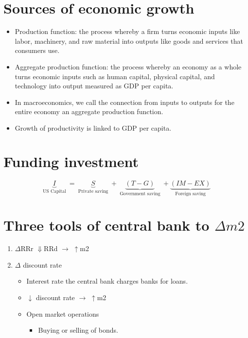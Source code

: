 \documentclass[openany]{book}
\begin{document}
\section{Sources of economic growth}
\begin{itemize}
    \item Production function: the process whereby a firm turns economic inputs like labor, machinery, and raw material into outputs like goods and services that consumers use.
    \item Aggregate production function: the process whereby an economy as a whole turns economic inputs such as human capital, physical capital, and technology into output measured as GDP per capita. 
    \item In macroeconomics, we call the connection from inputs to outputs for the entire economy an aggregate production function.
    \item Growth of productivity is linked to GDP per capita.
\end{itemize}

\section{Funding investment}
\[
  \underbrace{I}_{\text{ US Capital }} = \underbrace{S}_{\text{ Private saving }} + \underbrace{(T-G)}_{\text{ Government saving }} + \underbrace{(IM-EX)}_{\text{ Foreign saving }}
\]

\section{Three tools of central bank to $\Delta m2$ }
\begin{enumerate}
    \item $\Delta$RRr $\Downarrow$RRd $\rightarrow$ $\uparrow $m2
    \item $\Delta$ discount rate 
        \begin{itemize}
            \item Interest rate the central bank charges banks for loans. 
            \item $\downarrow $ discount rate $\rightarrow$ $\uparrow $m2
            \item Open market operations 
                \begin{itemize}
                    \item Buying or selling of bonds.
                \end{itemize}
        \end{itemize}
\end{enumerate}
\end{document}
